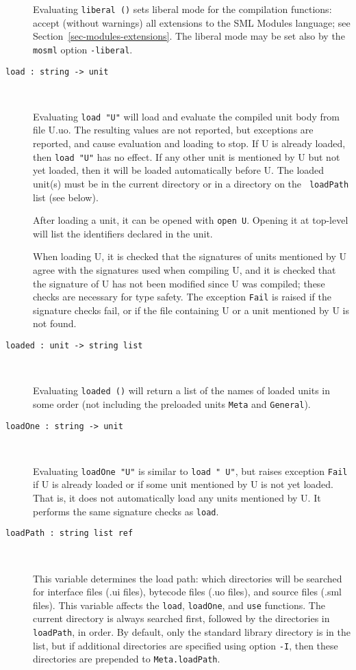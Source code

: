 \documentclass[fleqn]{article}
\begin{document}
\begin{description}
  Evaluating \texttt{liberal ()} sets liberal mode for the compilation
  functions: accept (without warnings) all extensions to the SML
  Modules language; see Section~\ref{sec-modules-extensions}.  The
  liberal mode may be set also by the \texttt{mosml} option
  \texttt{-liberal}.

\item[{\tt load :\ string -> unit}]\mbox{ }

  Evaluating {\tt load "{\rm U}"} will load and evaluate the compiled
  unit body from file U.uo.  The resulting values are not reported,
  but exceptions are reported, and cause evaluation and loading to
  stop.  If U is already loaded, then {\tt load "{\rm U}"} has no
  effect.  If any other unit is mentioned by U but not yet loaded,
  then it will be loaded automatically before U.  The loaded unit(s)
  must be in the current directory or in a directory on the {\tt
    loadPath} list (see below).

  After loading a unit, it can be opened with {\tt open U}.  Opening
  it at top-level will list the identifiers declared in the unit.

  When loading U, it is checked that the signatures of units mentioned
  by U agree with the signatures used when compiling U, and it is
  checked that the signature of U has not been modified since U was
  compiled; these checks are necessary for type safety.  The exception
  {\tt Fail} is raised if the signature checks fail, or if the file
  containing U or a unit mentioned by U is not found.

\item[{\tt loaded :\ unit -> string list}]\mbox{ }
  
  Evaluating {\tt loaded ()} will return a list of the names of loaded
  units in some order (not including the preloaded units {\tt Meta}
  and {\tt General}).

\item[{\tt loadOne :\ string -> unit}]\mbox{ }

  Evaluating {\tt loadOne "{\rm U}"} is similar to {\tt load "{\rm
      U}"}, but raises exception {\tt Fail} if U is already loaded or
  if some unit mentioned by U is not yet loaded.  That is, it does not
  automatically load any units mentioned by U.  It performs the same
  signature checks as {\tt load}.

\item[{\tt loadPath :\ string list ref}]\mbox{ }

  This variable determines the load path: which directories will be
  searched for interface files (.ui files), bytecode files (.uo
  files), and source files (.sml files).  This variable affects the
  {\tt load}, {\tt loadOne}, and {\tt use} functions.  The current
  directory is always searched first, followed by the directories in
  {\tt loadPath}, in order.  By default, only the standard library
  directory is in the list, but if additional directories are
  specified using option {\tt -I}, then these directories are
  prepended to {\tt Meta.loadPath}.


\end{description}
\end{document}
